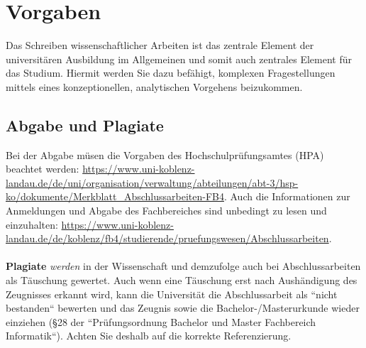 \documentclass[%
	BCOR=8.25mm,         %
	DIV=12,              %
	parskip=half,		 %
	toc=bibliography,	 %
	headsepline=on,      %
	oneside,
	toc=listof,
	toc=index,
	enabledeprecatedfontcommands,
	]{scrbook}
\begin{document}
\pagestyle{plain}




\chapter{Vorgaben}
Das Schreiben wissenschaftlicher Arbeiten ist das zentrale Element der universit\"aren Ausbildung im Allgemeinen und somit auch zentrales Element für das Studium. Hiermit werden Sie dazu bef\"ahigt, komplexen Fragestellungen mittels eines konzeptionellen, analytischen Vorgehens beizukommen. 


\section{Abgabe und Plagiate}
Bei der Abgabe m\"usen die Vorgaben des Hochschulpr\"ufungsamtes (HPA) beachtet werden: \url{https://www.uni-koblenz-landau.de/de/uni/organisation/verwaltung/abteilungen/abt-3/hsp-ko/dokumente/Merkblatt_Abschlussarbeiten-FB4}. Auch die Informationen zur Anmeldungen und Abgabe des Fachbereiches sind unbedingt zu lesen und einzuhalten: \url{https://www.uni-koblenz-landau.de/de/koblenz/fb4/studierende/pruefungswesen/Abschlussarbeiten}.\\ \\
\textbf{Plagiate} \textit{werden} in der Wissenschaft und demzufolge auch bei Abschlussarbeiten als T\"auschung gewertet. Auch wenn eine T\"auschung erst nach Aush\"andigung des Zeugnisses erkannt wird, kann die Universit\"at die Abschlussarbeit als ``nicht bestanden`` bewerten und das Zeugnis sowie die Bachelor-/Masterurkunde wieder einziehen (§28 der ``Prüfungsordnung Bachelor und Master Fachbereich Informatik``). Achten Sie deshalb auf die korrekte Referenzierung.
\end{document}
